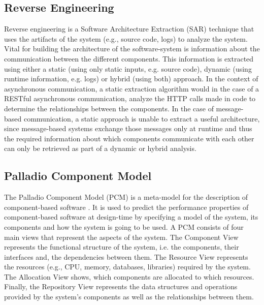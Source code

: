 \subsection{Reverse Engineering}
\label{sec:Foundation:SAR}
Reverse engineering is a Software Architecture Extraction (SAR) technique that uses the artifacts of the system (e.g., source code, logs) to analyze the system.
Vital for building the architecture of the software-system is information about the communication between the different components.
This information is extracted using either a static (using only static inputs, e.g. source code), dynamic (using runtime information, e.g. logs) or hybrid (using both) approach.
In the context of asynchronous communication, a static extraction algorithm would in the case of a RESTful asynchronous communication, analyze the HTTP calls made in code to determine the relationships between the components.
In the case of message-based communication, a static approach is unable to extract a useful architecture, since message-based systems exchange those messages only at runtime and thus the required information about which components communicate with each other can only be retrieved as part of a dynamic or hybrid analysis. \cite{Singh2021,Mayer2018}


\subsection{Palladio Component Model}
\label{sec:Foundation:PCM}
The Palladio Component Model (PCM) is a meta-model for the description of component-based software \cite{Becker2008}.
It is used to predict the performance properties of component-based software at design-time by specifying a model of the system, its components and how the system is going to be used.
A PCM consists of four main views that represent the aspects of the system.
The Component View represents the functional structure of the system, i.e. the components, their interfaces and, the dependencies between them.
The Resource View represents the resources (e.g., CPU, memory, databases, libraries) required by the system.
The Allocation View shows, which components are allocated to which resources.
Finally, the Repository View represents the data structures and operations provided by the system's components as well as the relationships between them. \cite{Becker2008}
